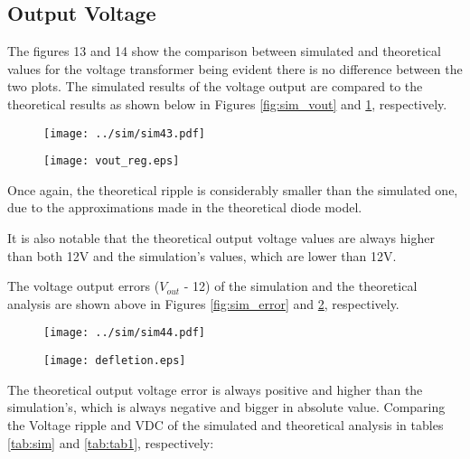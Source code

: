 \subsection{Output Voltage}
The figures 13 and 14 show the comparison between simulated and theoretical values for the voltage transformer being evident there is no difference between the two plots.
The simulated results of the voltage output are compared to the theoretical results as shown below in Figures \ref{fig:sim_vout} and \ref{fig:theo_vout}, respectively.

\begin{figure} [h]
\centering
\begin{minipage}{.5\textwidth}
  \centering
  \texttt{[image: ../sim/sim43.pdf]}
  \label{fig:sim_vout}
\end{minipage}%
\begin{minipage}{.5\textwidth}
  \centering
  \texttt{[image: vout\_reg.eps]}
  \label{fig:theo_vout}
\end{minipage}
\end{figure}

Once again, the theoretical ripple is considerably smaller than the simulated one, due to the approximations made in the theoretical diode model.

It is also notable that the theoretical output voltage values are always higher than both 12V and the simulation's values, which are lower than 12V.  

The voltage output errors ($V_{out}$ - 12) of the simulation and the theoretical analysis are shown above in Figures \ref{fig:sim_error} and \ref{fig:theo_error}, respectively.


\begin{figure}
\centering
\begin{minipage}{.5\textwidth}
  \centering
  \texttt{[image: ../sim/sim44.pdf]}
  \label{fig:sim_error}
\end{minipage}%
\begin{minipage}{.5\textwidth}
  \centering
  \texttt{[image: defletion.eps]}
  \label{fig:theo_error}
\end{minipage}
\end{figure}

\pagebreak The theoretical output voltage error is always positive and higher than the simulation's, which is always negative and bigger in absolute value.
Comparing the Voltage ripple and VDC of the simulated and theoretical analysis in tables \ref{tab:sim} and \ref{tab:tab1}, respectively:

